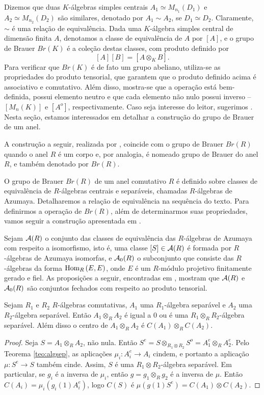 Dizemos que duas $K$-álgebras simples centrais $A_1 \simeq M_{n_1}(D_1)$ e $A_2 \simeq M_{n_2} (D_2)$ são similares, denotado por $A_1 \sim A_2$, se $D_1 \simeq D_2$. Claramente, $\sim$ é uma relação de equivalência. Dada uma $K$-álgebra simples central de dimensão finita $A$, denotamos a classe de equivalência de $A$ por $[A]$, e o grupo de Brauer $Br(K)$ é a coleção destas classes, com produto definido por \[[A][B] = [A\otimes_K B].\]
Para verificar que $Br(K)$ é de fato um grupo abeliano, utiliza-se as propriedades do produto tensorial, que garantem que o produto definido acima é associativo e comutativo. Além disso, mostra-se que a operação está bem-definida, possui elemento neutro e que cada elemento não nulo possui inverso -- $[M_n(K)]$ e $[A^o]$, respectivamente. Caso seja interesse do leitor, sugerimos \cite{dis:brauer}. Nesta seção, estamos interessados em detalhar a construção do grupo de Brauer de um anel. \par 
A construção a seguir, realizada por \citeauthor{brauer}, coincide com o grupo de Brauer $Br(R)$ quando o anel $R$ é um corpo e, por analogia, é nomeado grupo de Brauer do anel $R$, e também denotado por $Br(R)$. \par 
O grupo de Brauer $Br(R)$ de um anel comutativo $R$ é definido sobre classes de equivalência de $R$-álgebras centrais e separáveis, chamadas $R$-álgebras de Azumaya. Detalharemos a relação de equivalência na sequência do texto. Para definirmos a operação de $Br(R)$, além de determinarmos suas propriedades, vamos seguir a construção apresentada em \cite{brauer}. \par 
Sejam $\mathcal{A}(R)$ o conjunto das classes de equivalência das $R$-álgebras de Azumaya com respeito a isomorfismo, isto é, uma classe $[S] \in \mathcal{A}(R)$ é formada por $R$-álgebras de Azumaya isomorfas, e $\mathcal{A}_0(R)$ o subconjunto que consiste das $R$-álgebras da forma $\textrm{Hom}_{R}\left( E,E \right)$, onde $E$ é um $R$-módulo projetivo finitamente gerado e fiel. As proposições a seguir, encontradas em \cite{brauer}, mostram que $\mathcal{A}(R)$ e $\mathcal{A}_0(R)$ são conjuntos fechados com respeito ao produto tensorial. %
\begin{prop}\label{prop:brauer1}
Sejam $R_1$ e $R_2$ $R$-álgebras comutativas, $A_1$ uma $R_1$-álgebra separável e $A_2$ uma $R_2$-álgebra separável. Então $A_1 \otimes_R A_2$ é igual a $0$ ou é uma $R_1 \otimes_R R_2$-álgebra separável. Além disso o centro de $A_1\otimes_R A_2$ é $C(A_1)\otimes_R C(A_2)$.
\begin{proof}
Seja $S = A_1 \otimes_R A_2$, não nula. Então $S^e = S \otimes_{R_1 \otimes R_2}S^o = A_1^e \otimes_R A_2^e$. Pelo Teorema \ref{teo:algsep}, as aplicações $\mu_i: A_i^e \rightarrow A_i$ cindem, e portanto a aplicação $\mu: S^e \rightarrow S$ também cinde. Assim, $S$ é uma $R_1 \otimes R_2$-álgebra separável. Em particular, se $g_i$ é a inversa de $\mu_i$, então $g = g_1 \otimes_R g_2$ é a inversa de $\mu$. Então $C(A_i) = \mu_i(g_i(1)A_i^e)$, logo $C(S)$ é $\mu(g(1)S^e) = C(A_1) \otimes C(A_2)$.
\end{proof}
\end{prop}
